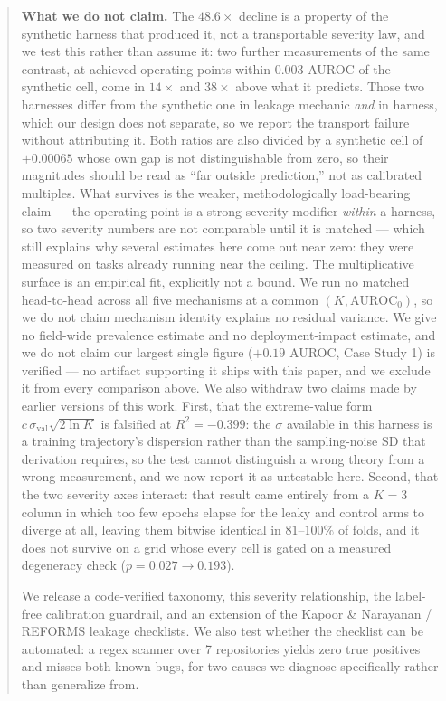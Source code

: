 \documentclass[10pt]{article} %
\begin{document}
\begin{abstract}
\textbf{What we do not claim.} The $48.6\times$ decline is a property of the
synthetic harness that produced it, not a transportable severity law, and we
test this rather than assume it: two further measurements of the same contrast,
at achieved operating points within $0.003$ AUROC of the synthetic cell, come
in $14\times$ and $38\times$ above what it predicts. Those two harnesses differ
from the synthetic one in leakage mechanic \emph{and} in harness, which our
design does not separate, so we report the transport failure without
attributing it. Both ratios are also divided by a synthetic cell of $+0.00065$
whose own gap is not distinguishable from zero, so their magnitudes should be
read as ``far outside prediction,'' not as calibrated multiples. What survives
is the weaker,
methodologically load-bearing claim --- the operating point is a strong
severity modifier \emph{within} a harness, so two severity numbers are not
comparable until it is matched --- which still explains why several estimates
here come out near zero: they were measured on tasks already running near the
ceiling. The multiplicative surface is an empirical fit, explicitly not a
bound. We run no matched head-to-head across all five mechanisms at a common
$(K,\text{AUROC}_0)$, so we do not claim mechanism identity explains no
residual variance. We give no field-wide prevalence estimate and no
deployment-impact estimate, and we do not claim our largest single figure
($+0.19$ AUROC, Case Study 1) is verified --- no artifact supporting it ships
with this paper, and we exclude it from every comparison above. We also
withdraw two claims made by earlier versions of this work. First, that the
extreme-value form $c\,\sigma_{\text{val}}\sqrt{2\ln K}$ is falsified at
$R^2=-0.399$: the $\sigma$ available in this harness is a training
trajectory's dispersion rather than the sampling-noise SD that derivation
requires, so the test cannot distinguish a wrong theory from a wrong
measurement, and we now report it as untestable here. Second, that the two
severity axes interact: that result came entirely from a $K=3$ column in
which too few epochs elapse for the leaky and control arms to diverge at all,
leaving them bitwise identical in $81$--$100\%$ of folds, and it does not
survive on a grid whose every cell is gated on a measured degeneracy check
($p=0.027\rightarrow0.193$).

We release a code-verified taxonomy, this severity relationship, the
label-free calibration guardrail, and an extension of the Kapoor \&
Narayanan / REFORMS leakage checklists. We also test whether the checklist
can be automated: a regex scanner over 7 repositories yields zero true
positives and misses both known bugs, for two causes we diagnose
specifically rather than generalize from.

\end{abstract}
\end{document}
